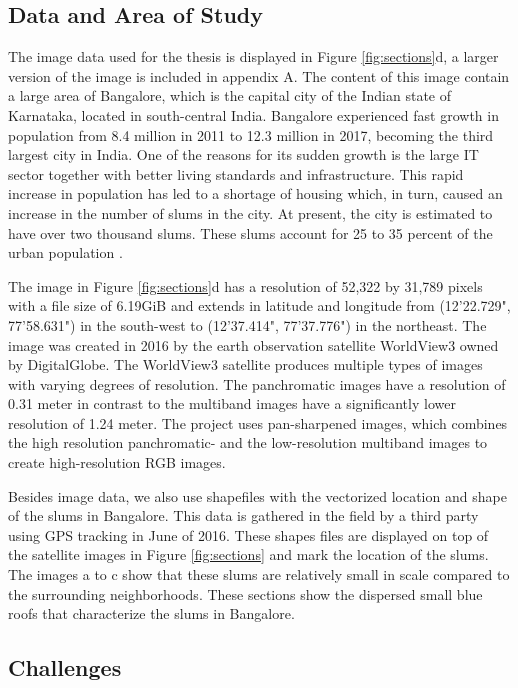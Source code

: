 \subsection{Data and Area of Study}
The image data used for the thesis is displayed in Figure \ref{fig:sections}d, a larger version of the image is included in appendix A. The content of this image contain a large area of Bangalore, which is the capital city of the Indian state of Karnataka, located in south-central India. Bangalore experienced fast growth in population from 8.4 million in 2011 to 12.3 million in 2017, becoming the third largest city in India\cite{popcount2017}. One of the reasons for its sudden growth is the large IT sector together with better living standards and infrastructure. This rapid increase in population has led to a shortage of housing which, in turn, caused an increase in the number of slums in the city. At present, the city is estimated to have over two thousand slums. These slums account for 25 to 35 percent of the urban population \cite{roy2018survey}.

The image in Figure \ref{fig:sections}d has a resolution of 52,322 by 31,789 pixels with a file size of 6.19GiB and extends in latitude and longitude from  (12'22.729", 77'58.631") in the south-west to (12'37.414", 77'37.776") in the northeast. The image was created in 2016 by the earth observation satellite WorldView3 owned by DigitalGlobe. The WorldView3 satellite produces multiple types of images with varying degrees of resolution. The panchromatic images have a resolution of 0.31 meter in contrast to the multiband images have a significantly lower resolution of 1.24 meter. The project uses pan-sharpened images, which combines the high resolution panchromatic- and the low-resolution multiband images to create high-resolution RGB images.

Besides image data, we also use shapefiles with the vectorized location and shape of the slums in Bangalore. This data is gathered in the field by a third party using GPS tracking in June of 2016. These shapes files are displayed on top of the satellite images in Figure \ref{fig:sections} and mark the location of the slums. The images a to c show that these slums are relatively small in scale compared to the surrounding neighborhoods. These sections show the dispersed small blue roofs that characterize the slums in Bangalore. 

\subsection{Challenges}

